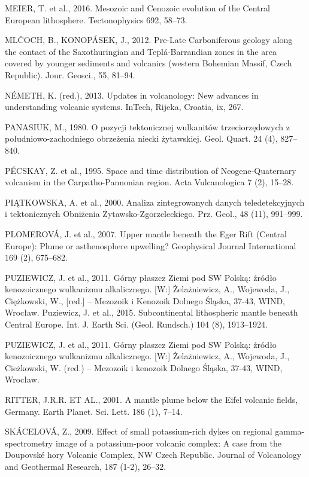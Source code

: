 \documentclass[11.5pt,twoside]{report}
\begin{document}
\begin{multicols}{3}
\uppercase{Meier, T.} et al., 2016. Mesozoic and Cenozoic evolution of the Central European lithosphere. Tectonophysics 692, 58–73.

\uppercase{MlČoch, B., Konop\'{A}sek, J.}, 2012. Pre-Late Carboniferous geology along the contact of the Saxothuringian and Teplá-Barrandian zones in the area covered by younger sediments and volcanics (western Bohemian Massif, Czech Republic). Jour. Geosci., 55, 81–94.

\uppercase{Németh, K.} (red.), 2013. Updates in volcanology: New advances in understanding volcanic systems. InTech, Rijeka, Croatia, ix, 267.

\uppercase{Panasiuk, M.}, 1980. O pozycji tektonicznej wulkanitów trzeciorzędowych z południowo-zachodniego obrzeżenia niecki żytawskiej. Geol. Quart. 24 (4), 827–840.

\uppercase{Pécskay, Z.} et al., 1995. Space and time distribution of Neogene-Quaternary volcanism in the Carpatho-Pannonian region. Acta Vulcanologica 7 (2), 15–28.

\uppercase{Piątkowska, A.} et al., 2000. Analiza zintegrowanych danych teledetekcyjnych i tektonicznych Obniżenia Żytawsko-Zgorzeleckiego. Prz. Geol., 48 (11), 991–999.

\uppercase{Plomerová, J.} et al., 2007. Upper mantle beneath the Eger Rift (Central Europe): Plume or asthenosphere upwelling? Geophysical Journal International 169 (2), 675–682.


\uppercase{Puziewicz, J.} et al., 2011. Górny płaszcz Ziemi pod SW Polską: źródło kenozoicznego wulkanizmu alkalicznego. [W:] Żelażniewicz, A., Wojewoda, J., Ciężkowski, W., [red.] – Mezozoik i Kenozoik Dolnego Śląska, 37-43, WIND, Wrocław.
Puziewicz, J. et al., 2015. Subcontinental lithospheric mantle beneath Central Europe. Int. J. Earth Sci. (Geol. Rundsch.) 104 (8), 1913–1924. 

\uppercase{Puziewicz, J.} et al., 2011. Górny płaszcz Ziemi pod SW Polską: źródło kenozoicznego wulkanizmu alkalicznego. [W:] Żelażniewicz, A., Wojewoda, J., Cieżkowski, W. (red.) – Mezozoik i kenozoik Dolnego Śląska, 37-43, WIND, Wrocław.

\uppercase{Ritter, J.R.R. et al.}, 2001. A mantle plume below the Eifel volcanic fields, Germany. Earth Planet. Sci. Lett. 186 (1), 7–14.


\uppercase{Skácelová, Z.}, 2009. Effect of small potassium-rich dykes on regional gamma-spectrometry image of a potassium-poor volcanic complex: A case from the Doupovské hory Volcanic Complex, NW Czech Republic. Journal of Volcanology and Geothermal Research, 187 (1-2), 26–32.


\end{multicols}
\end{document}
